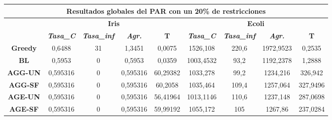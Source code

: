 \documentclass[12pt, spanish]{article}
\begin{document}
\begin{table}[H]
\footnotesize
\begin{tabular}{|c|c|c|c|c|c|c|c|c|}
\hline
\multicolumn{9}{|c|}{\textbf{Resultados globales del PAR con un 20\% de restricciones}}                                                                                                                                  \\ \hline
\multirow{2}{*}{}        & \multicolumn{4}{c|}{\textbf{Iris}}                                                            & \multicolumn{4}{c|}{\textbf{Ecoli}}                                                           \\ \cline{2-9} 
                         & \textit{\textbf{Tasa\_C}} & \textit{\textbf{Tasa\_inf}} & \textit{\textbf{Agr.}} & \textbf{T} & \textit{\textbf{Tasa\_C}} & \textit{\textbf{Tasa\_inf}} & \textit{\textbf{Agr.}} & \textbf{T} \\ \hline
\textbf{Greedy}          & 0,6488                    & 31                          & 1,3451                 & 0,0075     & 1526,108                  & 220,6                       & 1972,9523              & 0,2535     \\ \hline
\textbf{BL}              & 0,5953                    & 0                           & 0,5953                 & 0,0359     & 1003,4532                 & 93,2                        & 1192,2378              & 1,2888     \\ \hline
\textbf{AGG-UN}          & 0,595316                  & 0                           & 0,595316               & 60,29382   & 1033,278                  & 99,2                        & 1234,216               & 326,942    \\ \hline
\textbf{AGG-SF}          & 0,595316                  & 0                           & 0,595316               & 60,2058    & 1035,464                  & 109,4                       & 1257,064               & 327,9496   \\ \hline
\textbf{AGE-UN}          & 0,595316                  & 0                           & 0,595316               & 56,41964   & 1013,1146                 & 110,6                       & 1237,148               & 287,0698   \\ \hline
\textbf{AGE-SF}          & 0,595316                  & 0                           & 0,595316               & 59,99192   & 1055,172                  & 105                         & 1267,86                & 237,0284   \\ \hline

\end{tabular}
\end{table}
\end{document}
